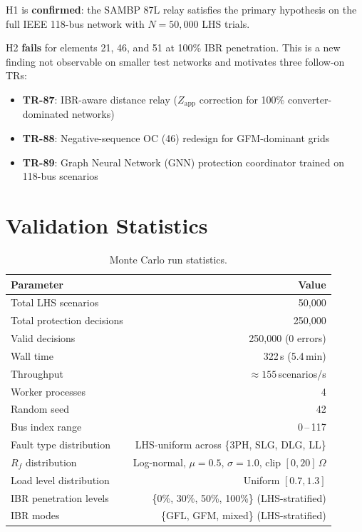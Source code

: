 \documentclass[11pt,a4paper]{article}
\begin{document}
H1 is \textbf{confirmed}: the SAMBP 87L relay satisfies the primary
hypothesis on the full IEEE 118-bus network with $N = 50{,}000$ LHS trials.

H2 \textbf{fails} for elements 21, 46, and 51 at 100\% IBR penetration.
This is a new finding not observable on smaller test networks and motivates
three follow-on TRs:
\begin{itemize}
  \item \textbf{TR-87}: IBR-aware distance relay ($Z_{\text{app}}$
        correction for 100\% converter-dominated networks)
  \item \textbf{TR-88}: Negative-sequence OC (46) redesign for GFM-dominant
        grids
  \item \textbf{TR-89}: Graph Neural Network (GNN) protection coordinator
        trained on 118-bus scenarios
\end{itemize}

\section{Validation Statistics}
\label{sec:stats}

\begin{table}[H]
\centering
\caption{Monte Carlo run statistics.}
\label{tab:mc_stats}
\begin{tabular}{lr}
\toprule
Parameter & Value \\
\midrule
Total LHS scenarios         & 50{,}000 \\
Total protection decisions  & 250{,}000 \\
Valid decisions             & 250{,}000 (0 errors) \\
Wall time                   & 322\,s (5.4\,min) \\
Throughput                  & $\approx 155$\,scenarios/s \\
Worker processes            & 4 \\
Random seed                 & 42 \\
\midrule
Bus index range             & 0\,--\,117 \\
Fault type distribution     & LHS-uniform across \{3PH, SLG, DLG, LL\} \\
$R_f$ distribution          & Log-normal, $\mu=0.5$, $\sigma=1.0$, clip $[0,20]\,\Omega$ \\
Load level distribution     & Uniform $[0.7, 1.3]$ \\
IBR penetration levels      & \{0\%, 30\%, 50\%, 100\%\} (LHS-stratified) \\
IBR modes                   & \{GFL, GFM, mixed\} (LHS-stratified) \\
\bottomrule
\end{tabular}
\end{table}
\end{document}
